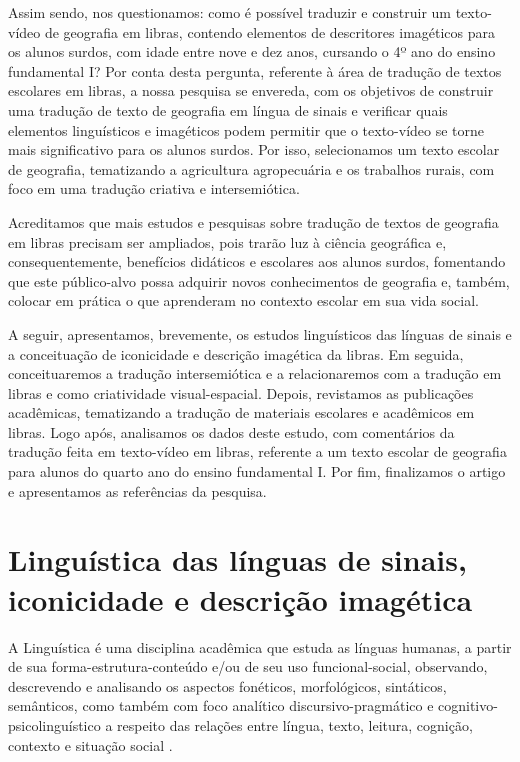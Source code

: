 \documentclass[portuguese]{textolivre}
\begin{document}
Assim sendo, nos questionamos: como é possível traduzir e construir um texto-vídeo de geografia em libras, contendo elementos de descritores imagéticos para os alunos surdos, com idade entre nove e dez anos, cursando o 4º ano do ensino fundamental I? Por conta desta pergunta, referente à área de tradução de textos escolares em libras, a nossa pesquisa se envereda, com os objetivos de construir uma tradução de texto de geografia em língua de sinais e verificar quais elementos linguísticos e imagéticos podem permitir que o texto-vídeo se torne mais significativo para os alunos surdos. Por isso, selecionamos um texto escolar de geografia, tematizando a agricultura agropecuária e os trabalhos rurais, com foco em uma tradução criativa e intersemiótica. 

Acreditamos que mais estudos e pesquisas sobre tradução de textos de geografia em libras precisam ser ampliados, pois trarão luz à ciência geográfica e, consequentemente, benefícios didáticos e escolares aos alunos surdos, fomentando que este público-alvo possa adquirir novos conhecimentos de geografia e, também, colocar em prática o que aprenderam no contexto escolar em sua vida social. 

A seguir, apresentamos, brevemente, os estudos linguísticos das línguas de sinais e a conceituação de iconicidade e descrição imagética da libras. Em seguida, conceituaremos a tradução intersemiótica e a relacionaremos com a tradução em libras e como criatividade visual-espacial. Depois, revistamos as publicações acadêmicas, tematizando a tradução de materiais escolares e acadêmicos em libras. Logo após, analisamos os dados deste estudo, com comentários da tradução feita em texto-vídeo em libras, referente a um texto escolar de geografia para alunos do quarto ano do ensino fundamental I. Por fim, finalizamos o artigo e apresentamos as referências da pesquisa.

\section{Linguística das línguas de sinais, iconicidade e descrição imagética}\label{sec-normas}
A Linguística é uma disciplina acadêmica que estuda as línguas humanas, a partir de sua forma-estrutura-conteúdo e/ou de seu uso funcional-social, observando, descrevendo e analisando os aspectos fonéticos, morfológicos, sintáticos, semânticos, como também com foco analítico discursivo-pragmático e cognitivo-psicolinguístico a respeito das relações entre língua, texto, leitura, cognição, contexto e situação social \cite{petter2002linguagem,bagno2014lingua}. 
\end{document}
